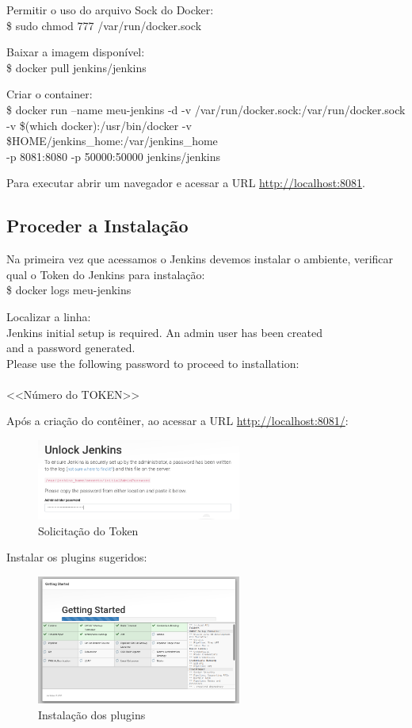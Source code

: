 \documentclass[a4paper,11pt]{article}
\begin{document}
Permitir o uso do arquivo Sock do Docker: \\
{\ttfamily\$ sudo chmod 777 /var/run/docker.sock}

Baixar a imagem disponível: \\
{\ttfamily\$ docker pull jenkins/jenkins}

Criar o container: \\
{\ttfamily\$ docker run --name meu-jenkins -d -v /var/run/docker.sock:/var/run/docker.sock \\
-v \$(which docker):/usr/bin/docker -v \$HOME/jenkins\_home:/var/jenkins\_home \\
-p 8081:8080 -p 50000:50000 jenkins/jenkins}

Para executar abrir um navegador e acessar a URL \url{http://localhost:8081}.

\subsection{Proceder a Instalação}
Na primeira vez que acessamos o Jenkins devemos instalar o ambiente, verificar qual o Token do Jenkins para instalação: \\
{\ttfamily\$ docker logs meu-jenkins}

Localizar a linha: \\
{\ttfamily Jenkins initial setup is required. An admin user has been created \\
 and a password generated. \\
Please use the following password to proceed to installation: \\
\\
<<Número do TOKEN>>}

Após a criação do contêiner, ao acessar a URL \url{http://localhost:8081/}:
\begin{figure}[H]
	\centering
	\includegraphics[width=0.6\textwidth]{imagens/i1Unlock.png}
	\caption{Solicitação do Token}
\end{figure}

Instalar os plugins sugeridos:
\begin{figure}[H]
	\centering
	\includegraphics[width=0.6\textwidth]{imagens/i2Plugins.png}
	\caption{Instalação dos plugins}
\end{figure}
\end{document}
